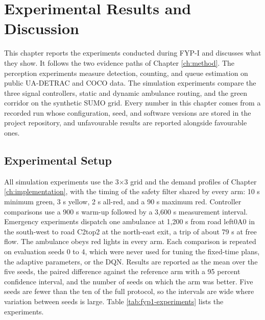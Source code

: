 \chapter{Experimental Results and Discussion}
\label{ch:results}

This chapter reports the experiments conducted during FYP-I and discusses what they show. It follows the two evidence paths of Chapter \ref{ch:method}. The perception experiments measure detection, counting, and queue estimation on public UA-DETRAC and COCO data. The simulation experiments compare the three signal controllers, static and dynamic ambulance routing, and the green corridor on the synthetic SUMO grid. Every number in this chapter comes from a recorded run whose configuration, seed, and software versions are stored in the project repository, and unfavourable results are reported alongside favourable ones.

\section{Experimental Setup}

All simulation experiments use the 3$\times$3 grid and the demand profiles of Chapter \ref{ch:implementation}, with the timing of the safety filter shared by every arm: 10 s minimum green, 3 s yellow, 2 s all-red, and a 90 s maximum red. Controller comparisons use a 900 s warm-up followed by a 3,600 s measurement interval. Emergency experiments dispatch one ambulance at 1,200 s from road left0A0 in the south-west to road C2top2 at the north-east exit, a trip of about 79 s at free flow. The ambulance obeys red lights in every arm. Each comparison is repeated on evaluation seeds 0 to 4, which were never used for tuning the fixed-time plans, the adaptive parameters, or the DQN. Results are reported as the mean over the five seeds, the paired difference against the reference arm with a 95 percent confidence interval, and the number of seeds on which the arm was better. Five seeds are fewer than the ten of the full protocol, so the intervals are wide where variation between seeds is large. Table \ref{tab:fyp1-experiments} lists the experiments.

